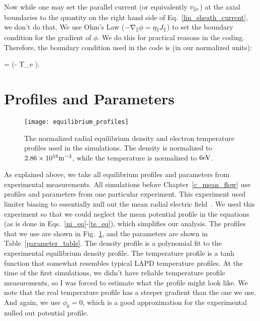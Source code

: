 Now while one may set the parallel current (or equivalently $v_{\parallel e}$) at the axial boundaries to the quantity on the right hand side of Eq.~\ref{lin_sheath_current}, we don't do that.
We use Ohm's Law ($- \nabla_\parallel \phi = \eta_\parallel J_\parallel$) to set the boundary condition for the gradient of $\phi$. We do this for practical reasons in the coding. Therefore, the
boundary condition used in the code is (in our normalized units):

\beq
\label{sheath_bc}
\gradpar \phi = \pm {} \left(\phi - \Lambda T_e  \right).
\eeq



\section{Profiles and Parameters}
\label{s_profs_params}

\begin{figure}[!htbp]
\texttt{[image: equilibrium\_profiles]}
\hfil
\caption{The normalized radial equilibrium density and electron temperature profiles used in the simulations. The density is normalized to $2.86 \times 10^{18} {\rm m^{-3}}$, while the temperature
is normalized to $6 {\rm eV}$.}
\label{equilibrium_profiles}
\end{figure}


As explained above, we take all equilibrium profiles and parameters from experimental measurements. 
All simulations before Chapter~\ref{c_mean_flow} use profiles and parameters from one particular experiment.
This experiment used limiter biasing to essentially null out the mean radial electric field~\cite{schaffner2012}. We used this experiment so that we could neglect the mean potential profile
in the equations (as is done in Eqs.~\ref{ni_eq}-\ref{te_eq}), which simplifies our analysis. The profiles that we use are shown in Fig.~\ref{equilibrium_profiles}, and the parameters
are shown in Table~\ref{parameter_table}. The density profile is
a polynomial fit to the experimental equilibrium density profile. The temperature profile is a tanh function that somewhat resembles typical LAPD temperature profiles. At the time of the first
simulations, we didn't have reliable temperature profile measurements, so I was forced to estimate what the profile might look like. We note that the real temperature profile has a steeper
gradient than the one we use. And again, we use $\phi_0 = 0$, which is a good approximation for the experimental nulled out potential profile.

